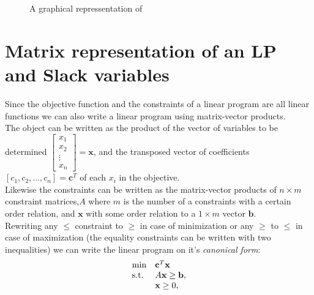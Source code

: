 \begin{figure}[H]
\caption{A graphical repressentation of }
\end{figure}
\section{Matrix representation of an LP and Slack variables}
Since the objective function and the constraints of a linear program are all linear functions we can also write a linear program using matrix-vector products. \\
The object can be written as the product of the vector of variables to be determined 
$\begin{bmatrix}x_{1} \\ x_{2} \\
\vdots \\
x_{n}
\end{bmatrix}=\textbf{x}$, and the transposed vector of coefficients $[c_1,c_2,...,c_n]=\textbf{c}^T$ of each $x_i$ in the objective.\\
Likewise the constraints can be written as the matrix-vector products of $n\times m$ constraint matrices,$A$ where $m$ is the number of a constraints with a certain order relation, and $\textbf{x}$ with some order relation to a $1\times m$ vector $\textbf{b}$.\\
Rewriting any $\leq$ constraint to $\geq$ in case of minimization or any $\geq$ to $\leq$ in case of maximization (the equality constraints can be written with two inequalities) we can write the linear program on it's \textit{canonical form}:
\begin{align}\label{canonicalMin}
\begin{array}{ll@{}ll}
\text{min} &\textbf{c}^T\textbf{x}&\\
\text{s.t.} &A\textbf{x} \geq \textbf{b},&\\
&\textbf{x} \geq 0,&\\
\end{array}
\end{align}

